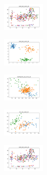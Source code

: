 \begin{figure}[H]
    \hfill
    \begin{subfigure}
        \centering
        \includegraphics[width=0.234\textwidth]{img/hs-ls-v2/ecoli_set_const_20_589741062_clust.png}
    \end{subfigure}
    \hfill
    \begin{subfigure}
        \centering
        \includegraphics[width=0.234\textwidth]{img/hs-ls-v2/rand_set_const_20_589741062_clust.png}
    \end{subfigure}
    \hfill
    \begin{subfigure}
        \centering
        \includegraphics[width=0.234\textwidth]{img/hs-ls-v2/newthyroid_set_const_20_589741062_clust.png}
    \end{subfigure}
    \hfill
    \begin{subfigure}
        \centering
        \includegraphics[width=0.234\textwidth]{img/hs-ls-v2/iris_set_const_20_277451237_clust.png}
    \end{subfigure}
    \hfill
    \begin{subfigure}
        \centering
        \includegraphics[width=0.234\textwidth]{img/hs-ls-v2/ecoli_set_const_20_277451237_clust.png}
    \end{subfigure}
    \hfill
    \begin{subfigure}

\end{subfigure}
\end{figure}
